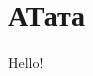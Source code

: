 \documentclass[a4paper, 12pt]{article}
\begin{document}

\pagebreak
\tableofcontents
\newpage
\section{АТата}
Hello!
\end{document}
